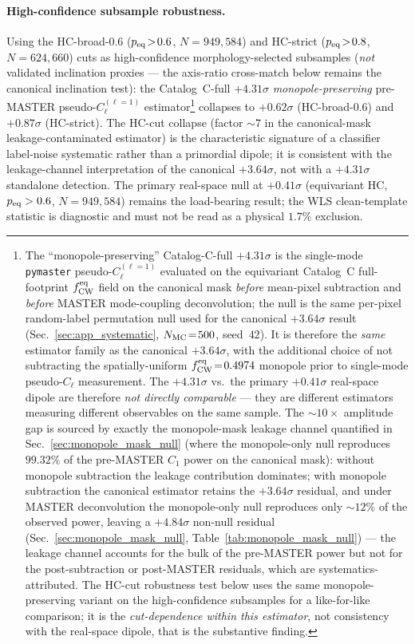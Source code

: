 \documentclass[aps,prd,twocolumn,superscriptaddress,preprintnumbers,nofootinbib,longbibliography,floatfix]{revtex4-2}
\newcommand{\sigmaunit}{\sigma}
\begin{document}
\paragraph{High-confidence subsample robustness.}
Using the HC-broad-0.6 ($p_{\rm eq}\!>\!0.6$, $N\!=\!949{,}584$) and HC-strict ($p_{\rm eq}\!>\!0.8$, $N\!=\!624{,}660$) cuts as high-confidence morphology-selected subsamples (\emph{not} validated inclination proxies --- the axis-ratio cross-match below remains the canonical inclination test): the Catalog~C-full $+4.31\sigmaunit$ \emph{monopole-preserving} pre-MASTER pseudo-$C_\ell^{(\ell=1)}$ estimator\footnote{The ``monopole-preserving'' Catalog-C-full $+4.31\sigmaunit$ is the single-mode \texttt{pymaster} pseudo-$C_\ell^{(\ell=1)}$ evaluated on the equivariant Catalog~C full-footprint $f_{\rm CW}^{\rm eq}$ field on the canonical mask \emph{before} mean-pixel subtraction and \emph{before} MASTER mode-coupling deconvolution; the null is the same per-pixel random-label permutation null used for the canonical $+3.64\sigmaunit$ result (Sec.~\ref{sec:app_systematic}, $N_{\rm MC}\!=\!500$, seed~$42$). It is therefore the \emph{same} estimator family as the canonical $+3.64\sigmaunit$, with the additional choice of not subtracting the spatially-uniform $f_{\rm CW}^{\rm eq}\!=\!0.4974$ monopole prior to single-mode pseudo-$C_\ell$ measurement. The $+4.31\sigmaunit$ vs.\ the primary $+0.41\sigmaunit$ real-space dipole are therefore \emph{not directly comparable} — they are different estimators measuring different observables on the same sample. The $\sim\!10\times$ amplitude gap is sourced by exactly the monopole-mask leakage channel quantified in Sec.~\ref{sec:monopole_mask_null} (where the monopole-only null reproduces $99.32\%$ of the pre-MASTER $C_1$ power on the canonical mask): without monopole subtraction the leakage contribution dominates; with monopole subtraction the canonical estimator retains the $+3.64\sigmaunit$ residual, and under MASTER deconvolution the monopole-only null reproduces only ${\sim}12\%$ of the observed power, leaving a $+4.84\sigmaunit$ non-null residual (Sec.~\ref{sec:monopole_mask_null}, Table~\ref{tab:monopole_mask_null}) --- the leakage channel accounts for the bulk of the pre-MASTER power but not for the post-subtraction or post-MASTER residuals, which are systematics-attributed. The HC-cut robustness test below uses the same monopole-preserving variant on the high-confidence subsamples for a like-for-like comparison; it is the \emph{cut-dependence within this estimator}, not consistency with the real-space dipole, that is the substantive finding.} collapses to $+0.62\sigmaunit$ (HC-broad-0.6) and $+0.87\sigmaunit$ (HC-strict). The HC-cut collapse (factor $\sim\!7$ in the canonical-mask leakage-contaminated estimator) is the characteristic signature of a classifier label-noise systematic rather than a primordial dipole; it is consistent with the leakage-channel interpretation of the canonical $+3.64\sigmaunit$, not with a $+4.31\sigmaunit$ standalone detection. The primary real-space null at $+0.41\sigmaunit$ (equivariant HC, $p_{\rm eq}>0.6$, $N=949{,}584$) remains the load-bearing result; the WLS clean-template statistic is diagnostic and must not be read as a physical $1.7\%$ exclusion.
\end{document}
